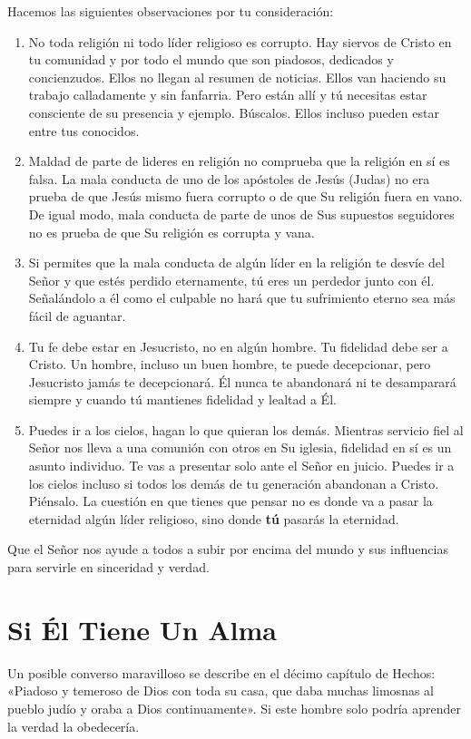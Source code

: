 \documentclass[12pt, twoside, openright]{book}
\begin{document}
Hacemos las siguientes observaciones por tu consideración:
\begin{enumerate}
\item No toda religión ni todo líder religioso es corrupto. Hay siervos de Cristo en tu comunidad y por todo el mundo que son piadosos, dedicados y concienzudos. Ellos no llegan al resumen de noticias. Ellos van haciendo su trabajo calladamente y sin fanfarria. Pero están allí y tú necesitas estar consciente de su presencia y ejemplo. Búscalos. Ellos incluso pueden estar entre tus conocidos.
\item Maldad de parte de lideres en religión no comprueba que la religión en sí es falsa. La mala conducta de uno de los apóstoles de Jesús (Judas) no era prueba de que Jesús mismo fuera corrupto o de que Su religión fuera en vano. De igual modo, mala conducta de parte de unos de Sus supuestos seguidores no es prueba de que Su religión es corrupta y vana.
\item Si permites que la mala conducta de algún líder en la religión te desvíe del Señor y que estés perdido eternamente, tú eres un perdedor junto con él. Señalándolo a él como el culpable no hará que tu sufrimiento eterno sea más fácil de aguantar.
\item Tu fe debe estar en Jesucristo, no en algún hombre. Tu fidelidad debe ser a Cristo. Un hombre, incluso un buen hombre, te puede decepcionar, pero Jesucristo jamás te decepcionará. Él nunca te abandonará ni te desamparará siempre y cuando tú mantienes fidelidad y lealtad a Él.
\item Puedes ir a los cielos, hagan lo que quieran los demás. Mientras servicio fiel al Señor nos lleva a una comunión con otros en Su iglesia, fidelidad en sí es un asunto individuo. Te vas a presentar solo ante el Señor en juicio. Puedes ir a los cielos incluso si todos los demás de tu generación abandonan a Cristo. Piénsalo. La cuestión en que tienes que pensar no es donde va a pasar la eternidad algún líder religioso, sino donde \textbf{tú} pasarás la eternidad.
\end{enumerate}
Que el Señor nos ayude a todos a subir por encima del mundo y sus influencias para servirle en sinceridad y verdad.

\section{Si Él Tiene Un Alma}
Un posible converso maravilloso se describe en el décimo capítulo de Hechos: «Piadoso y temeroso de Dios con toda su casa, que daba muchas limosnas al pueblo judío y oraba a Dios continuamente». Si este hombre solo podría aprender la verdad la obedecería. 
\end{document}
